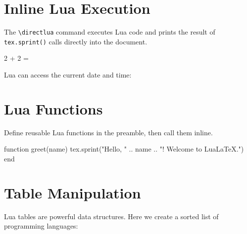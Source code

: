 \documentclass[
    language=english,
    doctype=article,
    institution=none,
]{../../omnilatex}
\begin{document}
\maketitle
\tableofcontents
\newpage

\section{Inline Lua Execution}

The \texttt{\textbackslash directlua} command executes Lua code and prints the
result of \texttt{tex.sprint()} calls directly into the document.

2 + 2 = 

Lua can access the current date and time:

\section{Lua Functions}

Define reusable Lua functions in the preamble, then call them inline.

\begin{luacode*}
function greet(name)
    tex.sprint("Hello, " .. name .. "! Welcome to LuaLaTeX.")
end
\end{luacode*}



\section{Table Manipulation}

Lua tables are powerful data structures. Here we create a sorted list of
programming languages:

\begin{itemize}
\end{itemize}
\end{document}
